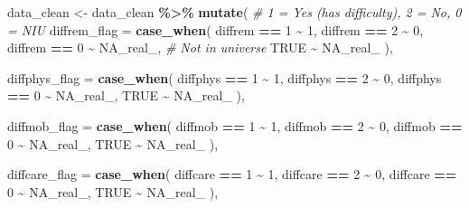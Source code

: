 \documentclass[
]{article}
\newenvironment{Shaded}{\begin{snugshade}}{\end{snugshade}}
\newcommand{\AttributeTok}[1]{\textcolor[rgb]{0.13,0.29,0.53}{#1}}
\newcommand{\CommentTok}[1]{\textcolor[rgb]{0.56,0.35,0.01}{\textit{#1}}}
\newcommand{\ConstantTok}[1]{\textcolor[rgb]{0.56,0.35,0.01}{#1}}
\newcommand{\DecValTok}[1]{\textcolor[rgb]{0.00,0.00,0.81}{#1}}
\newcommand{\FunctionTok}[1]{\textcolor[rgb]{0.13,0.29,0.53}{\textbf{#1}}}
\newcommand{\NormalTok}[1]{#1}
\newcommand{\OtherTok}[1]{\textcolor[rgb]{0.56,0.35,0.01}{#1}}
\newcommand{\SpecialCharTok}[1]{\textcolor[rgb]{0.81,0.36,0.00}{\textbf{#1}}}
\begin{document}
\begin{Shaded}
\begin{Highlighting}[]
\NormalTok{data\_clean }\OtherTok{\textless{}{-}}\NormalTok{ data\_clean }\SpecialCharTok{\%\textgreater{}\%}
  \FunctionTok{mutate}\NormalTok{(}
    \CommentTok{\# 1 = Yes (has difficulty), 2 = No, 0 = NIU}
    \AttributeTok{diffrem\_flag =} \FunctionTok{case\_when}\NormalTok{(}
\NormalTok{      diffrem }\SpecialCharTok{==} \DecValTok{1} \SpecialCharTok{\textasciitilde{}} \DecValTok{1}\NormalTok{,}
\NormalTok{      diffrem }\SpecialCharTok{==} \DecValTok{2} \SpecialCharTok{\textasciitilde{}} \DecValTok{0}\NormalTok{,}
\NormalTok{      diffrem }\SpecialCharTok{==} \DecValTok{0} \SpecialCharTok{\textasciitilde{}} \ConstantTok{NA\_real\_}\NormalTok{,  }\CommentTok{\# Not in universe}
      \ConstantTok{TRUE} \SpecialCharTok{\textasciitilde{}} \ConstantTok{NA\_real\_}
\NormalTok{    ),}
    
    \AttributeTok{diffphys\_flag =} \FunctionTok{case\_when}\NormalTok{(}
\NormalTok{      diffphys }\SpecialCharTok{==} \DecValTok{1} \SpecialCharTok{\textasciitilde{}} \DecValTok{1}\NormalTok{,}
\NormalTok{      diffphys }\SpecialCharTok{==} \DecValTok{2} \SpecialCharTok{\textasciitilde{}} \DecValTok{0}\NormalTok{,}
\NormalTok{      diffphys }\SpecialCharTok{==} \DecValTok{0} \SpecialCharTok{\textasciitilde{}} \ConstantTok{NA\_real\_}\NormalTok{,}
      \ConstantTok{TRUE} \SpecialCharTok{\textasciitilde{}} \ConstantTok{NA\_real\_}
\NormalTok{    ),}
    
    \AttributeTok{diffmob\_flag =} \FunctionTok{case\_when}\NormalTok{(}
\NormalTok{      diffmob }\SpecialCharTok{==} \DecValTok{1} \SpecialCharTok{\textasciitilde{}} \DecValTok{1}\NormalTok{,}
\NormalTok{      diffmob }\SpecialCharTok{==} \DecValTok{2} \SpecialCharTok{\textasciitilde{}} \DecValTok{0}\NormalTok{,}
\NormalTok{      diffmob }\SpecialCharTok{==} \DecValTok{0} \SpecialCharTok{\textasciitilde{}} \ConstantTok{NA\_real\_}\NormalTok{,}
      \ConstantTok{TRUE} \SpecialCharTok{\textasciitilde{}} \ConstantTok{NA\_real\_}
\NormalTok{    ),}
    
    \AttributeTok{diffcare\_flag =} \FunctionTok{case\_when}\NormalTok{(}
\NormalTok{      diffcare }\SpecialCharTok{==} \DecValTok{1} \SpecialCharTok{\textasciitilde{}} \DecValTok{1}\NormalTok{,}
\NormalTok{      diffcare }\SpecialCharTok{==} \DecValTok{2} \SpecialCharTok{\textasciitilde{}} \DecValTok{0}\NormalTok{,}
\NormalTok{      diffcare }\SpecialCharTok{==} \DecValTok{0} \SpecialCharTok{\textasciitilde{}} \ConstantTok{NA\_real\_}\NormalTok{,}
      \ConstantTok{TRUE} \SpecialCharTok{\textasciitilde{}} \ConstantTok{NA\_real\_}
\NormalTok{    ),}
    

\end{Highlighting}
\end{Shaded}
\end{document}
